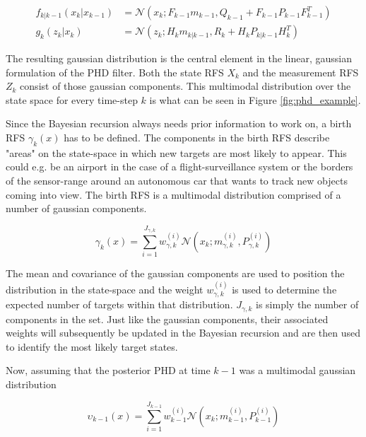 \begin{equation}
    \begin{split}
        f_{k|k-1}(x_k|x_{k-1}) &= \mathcal{N}(x_k; F_{k-1}m_{k-1}, Q_{k-1} + F_{k-1}P_{k-1}F_{k-1}^T) \\
        g_{k}(z_k|x_{k}) &= \mathcal{N}(z_k; H_{k}m_{k|k-1},R_{k}+H_{k}P_{k|k-1}H_{k}^T)
    \end{split}
    \label{eq:gauss_phd_models}
\end{equation}

The resulting gaussian distribution is the central element in the linear, gaussian formulation of the PHD filter. Both the state RFS $X_k$ and the measurement RFS $Z_k$ consist of those gaussian components. This multimodal distribution over the state space for every time-step $k$ is what can be seen in Figure \ref{fig:phd_example}.

Since the Bayesian recursion always needs prior information to work on, a birth RFS $\gamma_k(x)$ has to be defined. The components in the birth RFS describe "areas"  on the state-space in which new targets are most likely to appear. This could e.g. be an airport in the case of a flight-surveillance system or the borders of the sensor-range around an autonomous car that wants to track new objects coming into view. The birth RFS is a multimodal distribution comprised of a number of gaussian components.\cite{Vo2006PHD}

\begin{equation}
    \gamma_k(x) = \sum\limits_{i=1}^{J_{\gamma,k}} w^{(i)}_{\gamma,k} \mathcal{N}(x_k; m^{(i)}_{\gamma,k}, P^{(i)}_{\gamma,k})
\end{equation}

The mean and covariance of the gaussian components are used to position the distribution in the state-space and the weight $w^{(i)}_{\gamma,k}$ is used to determine the expected number of targets within that distribution. $J_{\gamma,k}$ is simply the number of components in the set. Just like the gaussian components, their associated weights will subsequently be updated in the Bayesian recursion and are then used to identify the most likely target states. 

Now, assuming that the posterior PHD at time $k-1$ was a multimodal gaussian distribution

\begin{equation}
    \upsilon_{k-1}(x) = \sum\limits_{i=1}^{J_{k-1}} w^{(i)}_{k-1} \mathcal{N}(x_k; m^{(i)}_{k-1},P^{(i)}_{k-1})    
\end{equation}


